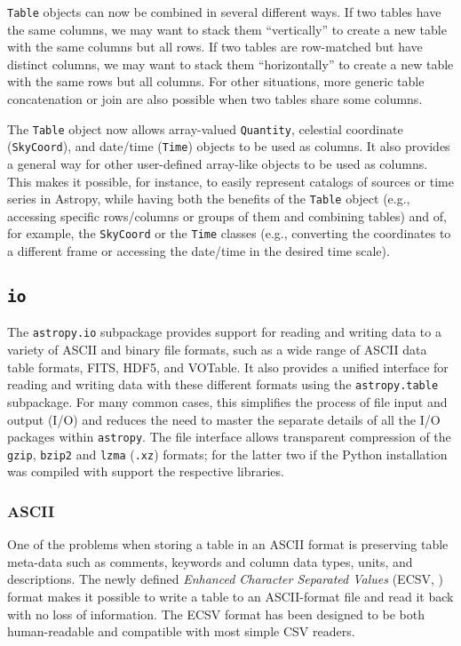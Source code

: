 \documentclass[modern]{aastex62}
\newcommand{\package}[1]{\texttt{#1}\xspace}
\newcommand{\astropy}{Astropy\xspace}
\newcommand{\astropypkg}{\package{astropy}}
\begin{document}
\texttt{Table} objects can now be combined in several different ways. If two
tables have the same columns, we may want to stack them ``vertically'' to create a
new table with the same columns but all rows. If two tables are row-matched but
have distinct columns, we may want to stack them ``horizontally'' to create a
new table with the same rows but all columns. For other situations, more generic
table concatenation or join are also possible when two tables share some
columns.


The \texttt{Table} object now allows array-valued \texttt{Quantity}, celestial
coordinate (\texttt{SkyCoord}), and date/time (\texttt{Time}) objects to
be used as columns. It also provides a general way for other user-defined
array-like objects to be used as columns.
This makes it possible, for instance, to easily
represent catalogs of sources or time series in \astropy, while having both the
benefits of the \texttt{Table} object (e.g., accessing specific rows/columns
or groups of them and combining tables) and of, for example,
the \texttt{SkyCoord} or the \texttt{Time} classes (e.g., converting the
coordinates to a different frame or accessing the date/time in the desired time scale).

\subsection{\package{io}}

The \package{astropy.io} subpackage provides support for reading and writing
data to a variety of ASCII and binary file formats, such as a wide range of
ASCII data table formats, FITS, HDF5, and VOTable.
It also provides a unified interface for reading and writing data with these
different formats using the \package{astropy.table} subpackage.
For many common cases, this simplifies the process of file input and output (I/O) and
reduces the need to master the separate details of all the I/O packages within
\astropypkg. The file interface allows transparent compression of
the \texttt{gzip}, \texttt{bzip2} and \texttt{lzma} (\texttt{.xz})
formats; for the latter two if the Python installation was compiled
with support the respective libraries.

\subsubsection{ASCII}

One of the problems when storing a table in an ASCII format is
preserving table meta-data such as comments, keywords and column data
types, units, and descriptions. The newly defined \emph{Enhanced
Character Separated Values} (ECSV,  \citealt{ape6}) format makes it
possible to write a table to an ASCII-format file and read it back
with no loss of information. The ECSV format has been designed to be
both human-readable and compatible with most simple CSV readers.
\end{document}
